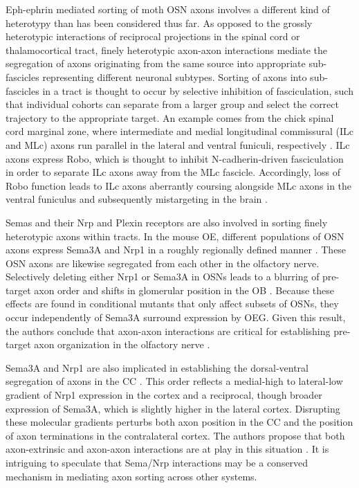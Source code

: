 Eph-ephrin mediated sorting of moth OSN axons involves a different kind of heterotypy than has been considered thus far.
As opposed to the grossly heterotypic interactions of reciprocal projections in the spinal cord or thalamocortical tract, finely heterotypic axon-axon interactions mediate the segregation of axons originating from the same source into appropriate sub-fascicles representing different neuronal subtypes.
Sorting of axons into sub-fascicles in a tract is thought to occur by selective inhibition of fasciculation, such that individual cohorts can separate from a larger group and select the correct trajectory to the appropriate target.
An example comes from the chick spinal cord marginal zone, where intermediate and medial longitudinal commissural (ILc and MLc) axons run parallel in the lateral and ventral funiculi, respectively \cite{sakai2012axon}.
ILc axons express Robo, which is thought to inhibit N-cadherin-driven fasciculation in order to separate ILc axons away from the MLc fascicle.
Accordingly, loss of Robo function leads to ILc axons aberrantly coursing alongside MLc axons in the ventral funiculus and subsequently mistargeting in the brain \cite{sakai2012axon}.

Semas and their Nrp and Plexin receptors are also involved in sorting finely heterotypic axons within tracts.
In the mouse OE, different populations of OSN axons express Sema3A and Nrp1 in a roughly regionally defined manner \cite{imai2009pre}.
These OSN axons are likewise segregated from each other in the olfactory nerve. 
Selectively deleting either Nrp1 or Sema3A in OSNs leads to a blurring of pre-target axon order and shifts in glomerular position in the OB \cite{imai2009pre}.
Because these effects are found in conditional mutants that only affect subsets of OSNs, they occur independently of Sema3A surround expression by OEG.
Given this result, the authors conclude that axon-axon interactions are critical for establishing pre-target axon organization in the olfactory nerve \cite{imai2009pre}.

Sema3A and Nrp1 are also implicated in establishing the dorsal-ventral segregation of axons in the CC \cite{zhou2013axon}.
This order reflects a medial-high to lateral-low gradient of Nrp1 expression in the cortex and a reciprocal, though broader expression of Sema3A, which is slightly higher in the lateral cortex.
Disrupting these molecular gradients perturbs both axon position in the CC and the position of axon terminations in the contralateral cortex.
The authors propose that both axon-extrinsic and axon-axon interactions are at play in this situation \cite{zhou2013axon}.
It is intriguing to speculate that Sema/Nrp interactions may be a conserved mechanism in mediating axon sorting across other systems.